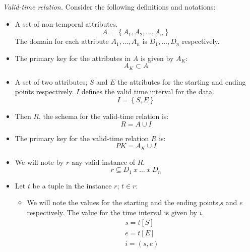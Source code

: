 \begin{definition}
\label{def:valid-time-relation}
\emph{Valid-time relation.}
Consider the following definitions and notations:

\begin{itemize}
 \item A set of non-temporal attributes.
	\begin{equation}
	\label{eq:attribute-set}
	A = \left \lbrace A_1, A_2, \ldots, A_n \right \rbrace
	\end{equation}
      The domain for each attribute $A_1, \ldots, A_n$ is $D_1, \ldots, D_n$ respectively. 
\item The primary key for the attributes in $A$ is given by $A_K$:
      \begin{equation}
       \label{eq:primary-key-a}
      A_K \subset A
      \end{equation}
\item A set of two attributes; $S$  and $E$ the attributes for the starting and ending points respectively. $I$ defines the valid time interval for the data. 
\begin{equation}
 \label{eq:attribute-time-interval}
I = \left \lbrace S, E \right \rbrace
\end{equation}
\item Then $R$, the schema for the valid-time relation is:
\begin{equation}
 \label{eq:valid-time-relation}
R = A \cup  I
\end{equation}
\item The primary key for the valid-time relation $R$ is:
\begin{equation}
 \label{eq:valid-time-temporal-pk}
PK = A_K \cup I
\end{equation}


\item We will note by $r$ any valid instance of $R$. 
      \begin{equation}
       \label{eq:valid-time-instance}
      r \subseteq D_1\ x\ \ldots\ x\ D_n
      \end{equation}

\item Let $t$ be a tuple in the instance $r$; $t \in r$:
      \begin{itemize}
      \item We will note the values for the starting and the ending  points,$s$ and $e$  respectively. The value for the time interval is given by $i$.
      \begin{align}
       \label{eq:starting-point}
      s = t\left[S \right]\\
      e = t\left[E \right]\\
      i = \left(s, e\right)
      \end{align}



\end{itemize}
\end{itemize}
\end{definition}
